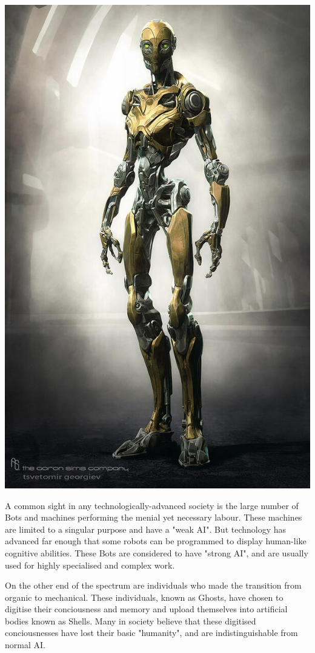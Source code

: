 \documentclass[10pt,twoside]{article}
\begin{document}
\begin{multicols}{2}
        \includegraphics[width=\linewidth]{BEzZuPdCEAAgcr8.jpg}

        A common sight in any technologically-advanced society is the large number of Bots and machines performing the menial yet necessary labour. These machines are limited to a singular purpose and have a "weak AI". But technology has advanced far enough that some robots can be programmed to display human-like cognitive abilities. These Bots are considered to have "strong AI", and are usually used for highly specialised and complex work.
        
        On the other end of the spectrum are individuals who made the transition from organic to mechanical. These individuals, known as Ghosts, have chosen to digitise their conciousness and memory and upload themselves into artificial bodies known as Shells. Many in society believe that these digitised conciousnesses have lost their basic "humanity", and are indistinguishable from normal AI. 
        

\end{multicols}
\end{document}
